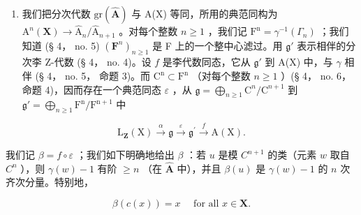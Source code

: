 \begin{enumerate}
\def\labelenumi{(\Alph{enumi})}
\setcounter{enumi}{2}
\tightlist
\item
  我们把分次代数 \(\mathrm{gr}(\hat{\mathbf{A}})\) 与 A(X) 等同，所用的典范同构为 \(\mathrm{A}^n (\mathbf{X})\to \hat{\mathrm{A}}_n / \hat{\mathrm{A}}_{n + 1}\) 。对每个整数 \(n\geqslant 1\) ，我们记 \(\mathrm{F^n} = \gamma^{-1}(\Gamma_n)\) ；我们知道 (§ 4， no. 5) \((\mathbf{F}^n)_{n\geqslant 1}\) 是 F 上的一个整中心滤过。用 \(\mathfrak{g}'\) 表示相伴的分次李 Z-代数 (§ 4， no. 4)。设 \(f\) 是李代数同态，它从 \(\mathfrak{g}'\) 到 A(X) 中，与 \(\gamma\) 相伴 (§ 4， no. 5， 命题 3)。而 \(\mathrm{C^n}\subset \mathrm{F^n}\) （对每个整数 \(n\geqslant 1\) ）(§ 4， no. 6， 命题 4)，因而存在一个典范同态 \(\varepsilon\) ，从 \(\mathfrak{g} = \bigoplus_{n\geqslant 1}\mathrm{C}^n /\mathrm{C}^{n + 1}\) 到 \(\mathfrak{g}' = \bigoplus_{n\geqslant 1}\mathrm{F^n / F^{n + 1}}\) 中
\end{enumerate}

\[
\mathrm{L} _ {\mathbf {Z}} (\mathrm{X}) \stackrel {{\alpha}} {{\longrightarrow}} \mathfrak {g} \stackrel {{\varepsilon}} {{\longrightarrow}} \mathfrak {g} ^ {\prime} \stackrel {{f}} {{\longrightarrow}} \mathrm{A} (\mathrm{X}).
\]

我们记 \(\beta = f\circ \varepsilon\) ；我们如下明确地给出 \(\beta\) ：若 \(u\) 是模 \(C^{n + 1}\) 的类（元素 \(w\) 取自 \(C^n\) ），则 \(\gamma (w) - 1\) 有阶 \(\geqslant n\) （在 \(\hat{\mathbf{A}}\) 中），并且 \(\beta (u)\) 是 \(\gamma (w) - 1\) 的 \(n\) 次齐次分量。特别地，

\[
\beta (c (x)) = x \quad \text { for   all } x \in \mathbf {X}.\tag{3}
\]
